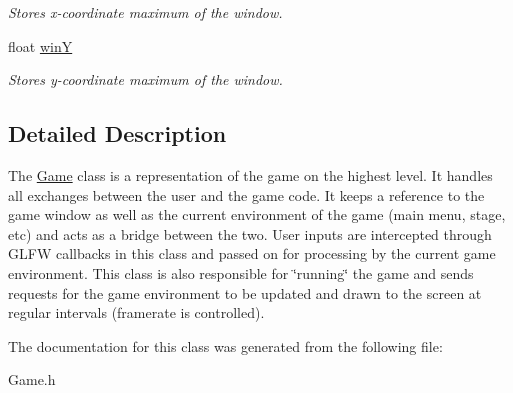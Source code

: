 \begin{DoxyCompactItemize}
\begin{DoxyCompactList}\small\item\em Stores x-\/coordinate maximum of the window. \end{DoxyCompactList}\item 
float \hyperlink{class_game_a04e6773bb06f62871bcab40fc907335a}{winY}\hypertarget{class_game_a04e6773bb06f62871bcab40fc907335a}{}\label{class_game_a04e6773bb06f62871bcab40fc907335a}

\begin{DoxyCompactList}\small\item\em Stores y-\/coordinate maximum of the window. \end{DoxyCompactList}\end{DoxyCompactItemize}


\subsection{Detailed Description}
The \hyperlink{class_game}{Game} class is a representation of the game on the highest level. It handles all exchanges between the user and the game code. It keeps a reference to the game window as well as the current environment of the game (main menu, stage, etc) and acts as a bridge between the two. User inputs are intercepted through G\+L\+FW callbacks in this class and passed on for processing by the current game environment. This class is also responsible for \char`\"{}running\char`\"{} the game and sends requests for the game environment to be updated and drawn to the screen at regular intervals (framerate is controlled). 

The documentation for this class was generated from the following file\+:\begin{DoxyCompactItemize}
\item 
Game.\+h\end{DoxyCompactItemize}
